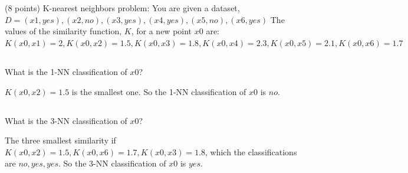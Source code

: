 \documentclass[paper=a4, fontsize=11pt]{scrartcl} %
\begin{document}
\maketitle %

\section{}

\begin{fancyquotes}
  (8 points) K-nearest neighbors problem:
  You are given a dataset, $D = {(x1,yes), (x2,no), (x3,yes), (x4,yes), (x5,no), (x6,yes)}$
  The values of the similarity function, $K$, for a new point $x0$ are: $K(x0,x1)=2, K(x0,x2)=1.5, K(x0,x3)=1.8, K(x0,x4)=2.3, K(x0,x5)=2.1, K(x0,x6)=1.7$
\end{fancyquotes}

\subsection{}
\begin{fancyquotes}
  What is the 1-NN classification of $x0$?
\end{fancyquotes}

$K(x0,x2)=1.5$ is the smallest one. So the 1-NN classification of $x0$
is $no$.

\subsection{}
\begin{fancyquotes}
  What is the 3-NN classification of $x0$?
\end{fancyquotes}

The three smallest similarity if $K(x0,x2)=1.5, K(x0,x6)=1.7,
K(x0,x3)=1.8$, which the classifications are $no, yes, yes$.
So the 3-NN classification of $x0$ is $yes$.

\pagebreak

\section{}
\end{document}
